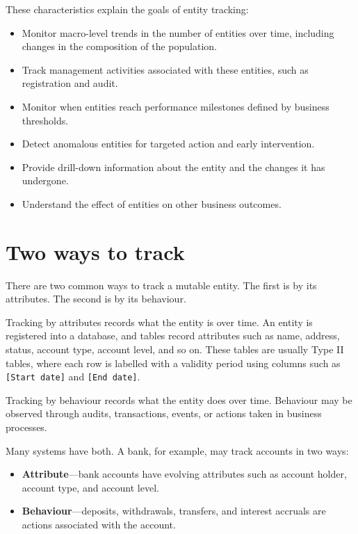 \documentclass[10pt,openany,10pt]{book}
\providecommand{\tightlist}{%
  \setlength{\itemsep}{0pt}\setlength{\parskip}{0pt}}
\begin{document}
These characteristics explain the goals of entity tracking:

\begin{itemize}
\tightlist
\item
  Monitor macro-level trends in the number of entities over time,
  including changes in the composition of the population.
\item
  Track management activities associated with these entities, such as
  registration and audit.
\item
  Monitor when entities reach performance milestones defined by business
  thresholds.
\item
  Detect anomalous entities for targeted action and early intervention.
\item
  Provide drill-down information about the entity and the changes it has
  undergone.
\item
  Understand the effect of entities on other business outcomes.
\end{itemize}

\section{Two ways to track}\label{two-ways-to-track}

There are two common ways to track a mutable entity. The first is by its
attributes. The second is by its behaviour.

Tracking by attributes records what the entity is over time. An entity
is registered into a database, and tables record attributes such as
name, address, status, account type, account level, and so on. These
tables are usually Type II tables, where each row is labelled with a
validity period using columns such as \texttt{{[}Start\ date{]}} and
\texttt{{[}End\ date{]}}.

Tracking by behaviour records what the entity does over time. Behaviour
may be observed through audits, transactions, events, or actions taken
in business processes.

Many systems have both. A bank, for example, may track accounts in two
ways:

\begin{itemize}
\tightlist
\item
  \textbf{Attribute}---bank accounts have evolving attributes such as
  account holder, account type, and account level.
\item
  \textbf{Behaviour}---deposits, withdrawals, transfers, and interest
  accruals are actions associated with the account.
\end{itemize}
\end{document}
